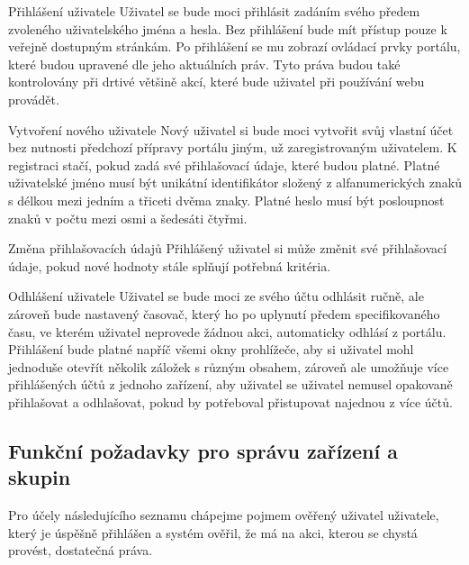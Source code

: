 \def\myprefix{F}
\begin{enumfunctional}[style=nextline]
\item[Přihlášení uživatele]
Uživatel se bude moci přihlásit zadáním svého předem zvoleného uživatelského jména a hesla. Bez přihlášení bude mít přístup pouze k veřejně dostupným stránkám. Po přihlášení se mu zobrazí ovládací prvky portálu, které budou upravené dle jeho aktuálních práv. Tyto práva budou také kontrolovány při drtivé většině akcí, které bude uživatel při používání webu provádět. 
\item[Vytvoření nového uživatele]
Nový uživatel si bude moci vytvořit svůj vlastní účet bez nutnosti předchozí přípravy portálu jiným, už zaregistrovaným uživatelem. K registraci stačí, pokud zadá své přihlašovací údaje, které budou platné. Platné uživatelské jméno musí být unikátní identifikátor složený z alfanumerických znaků s délkou mezi jedním a třiceti dvěma znaky. Platné heslo musí být posloupnost znaků v počtu mezi osmi a šedesáti čtyřmi.
\item[Změna přihlašovacích údajů]
Přihlášený uživatel si může změnit své přihlašovací údaje, pokud nové hodnoty stále splňují potřebná kritéria.
\item[Odhlášení uživatele]
Uživatel se bude moci ze svého účtu odhlásit ručně, ale zároveň bude nastavený časovač, který ho po uplynutí předem specifikovaného času, ve kterém uživatel neprovede žádnou akci, automaticky odhlásí z portálu. Přihlášení bude platné napříč všemi okny prohlížeče, aby si uživatel mohl jednoduše otevřít několik záložek s různým obsahem, zároveň ale umožňuje více přihlášených účtů z jednoho zařízení, aby uživatel se uživatel nemusel opakovaně přihlašovat a odhlašovat, pokud by potřeboval přistupovat najednou z více účtů.

\subsection{Funkční požadavky pro správu zařízení a skupin}
Pro účely následujícího seznamu chápejme pojmem ověřený uživatel uživatele, který je úspěšně přihlášen a systém ověřil, že má na akci, kterou se chystá provést, dostatečná práva.


\end{enumfunctional}
